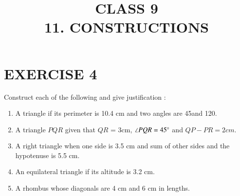 \documentclass{article}
\begin{document}
\title{CLASS 9\\11. CONSTRUCTIONS}
\date{}
\maketitle
\section{EXERCISE 4}
Construct each of the following and give justification :
\begin{enumerate}
\item A triangle if its perimeter is 10.4 cm and two angles are 45\degree and 120\degree.
\item A triangle $PQR$ given that $QR$ = 3cm, $\angle PQR = 45\degree$ and $QP - PR = 2 cm$.
\item A right triangle when one side is 3.5 cm and sum of other sides and the hypotenuse
is 5.5 cm.
\item An equilateral triangle if its altitude is 3.2 cm.
\item A rhombus whose diagonals are 4 cm and 6 cm in lengths.
\end{enumerate}
\end{document}
